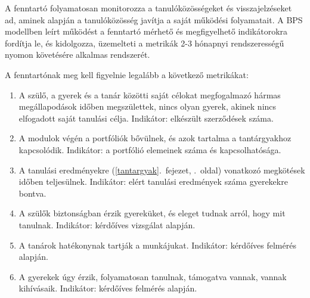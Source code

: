 A fenntartó folyamatosan monitorozza a tanulóközösségeket és
visszajelzéseket ad, aminek alapján a tanulóközösség javítja a saját
működési folyamatait. A BPS modellben leírt működést a fenntartó mérhető
és megfigyelhető indikátorokra fordítja le, és kidolgozza, üzemelteti a
metrikák 2-3 hónapnyi rendszerességű nyomon követésére alkalmas
rendszerét.

A fenntartónak meg kell figyelnie legalább a következő metrikákat:

\begin{enumerate}
\def\labelenumi{\arabic{enumi}.}
\tightlist
\item
  A szülő, a gyerek és a tanár közötti saját célokat megfogalmazó hármas
  megállapodások időben megszülettek, nincs olyan gyerek, akinek nincs
  elfogadott saját tanulási célja. Indikátor: elkészült szerződések
  száma.
\item
  A modulok végén a portfóliók bővülnek, és azok tartalma a
  tantárgyakhoz kapcsolódik. Indikátor: a portfólió elemeinek száma és
  kapcsolhatósága.
\item
  A
  tanulási eredményekre (\ref{tantargyak}.~fejezet, \pageref{tantargyak}.~oldal)
  vonatkozó megkötések időben teljesülnek. Indikátor: elért tanulási
  eredmények száma gyerekekre bontva.
\item
  A szülők biztonságban érzik gyereküket, és eleget tudnak
  arról,\break
  hogy
  mit tanulnak. Indikátor: kérdőíves vizsgálat alapján.
\item
  A tanárok hatékonynak tartják a munkájukat. Indikátor: kérdőíves
  felmérés alapján.
\item
  A gyerekek úgy érzik, folyamatosan tanulnak, támogatva vannak, vannak
  kihívásaik. Indikátor: kérdőíves felmérés alapján.
\end{enumerate}
